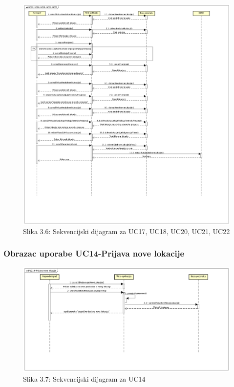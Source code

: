 				\begin{figure}[H]
        			\includegraphics[scale=0.3]{slike/Sekvencijski dijagrami/UC17, UC18, UC20, UC21, UC23.png}
        			\centering
        			\caption{Slika 3.6: Sekvencijski dijagram za UC17, UC18, UC20, UC21, UC22}
        			\label{fig:promjene}
        		\end{figure}
        		
        		\subsubsection{Obrazac uporabe UC14-Prijava nove lokacije}
				
				\begin{figure}[H]
        			\includegraphics[scale=0.4]{slike/Sekvencijski dijagrami/UC14-Prijava nove lokacije.png}
        			\centering
        			\caption{Slika 3.7: Sekvencijski dijagram za UC14}
        			\label{fig:promjene}
        		\end{figure}
	
